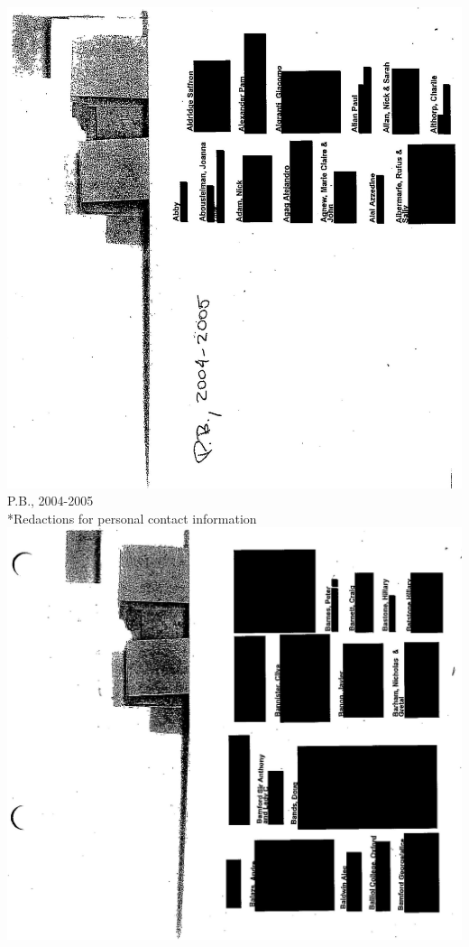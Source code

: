 \documentclass[10pt]{article}
\begin{document}
\includegraphics[max width=\textwidth, center]{2025_02_27_dd68c3d38de88f0516d9g-123}\\
P.B., 2004-2005\\
*Redactions for personal contact information\\
\includegraphics[max width=\textwidth, center]{2025_02_27_dd68c3d38de88f0516d9g-126}\\
\end{document}
